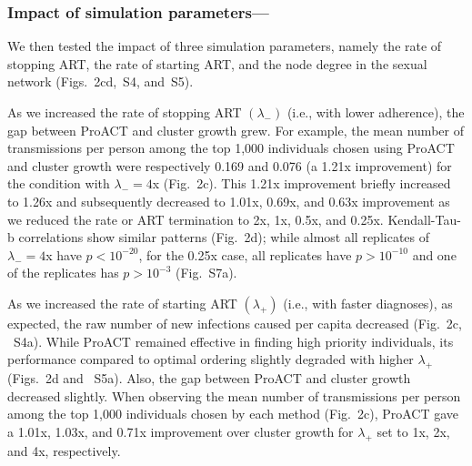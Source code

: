 \documentclass[a4paper,10pt]{article}
\begin{document}
\subsubsection{Impact of simulation parameters---}
We then tested the impact of three simulation parameters, namely the rate of stopping ART, the rate of starting ART, and the node degree in the sexual network (Figs.~2cd,~S4, and~S5).

As we increased the rate of stopping ART $\left(\lambda_{-}\right)$ (i.e., with lower adherence), the gap between ProACT and cluster growth grew.
For example, the mean number of transmissions per person among the top 1,000 individuals chosen using ProACT and cluster growth were respectively 0.169 and 0.076 (a 1.21x improvement) for the condition with $\lambda_-=4$x (Fig.~2c). 
This 1.21x improvement briefly increased to 1.26x and subsequently decreased to 1.01x, 0.69x, and 0.63x improvement as we reduced the rate or ART termination to 2x, 1x, 0.5x, and 0.25x.
Kendall-Tau-b correlations show similar patterns (Fig.~2d);
while almost all replicates of $\lambda_-=4$x have $p<10^{-20}$, for the 0.25x case, all replicates have $p>10^{-10}$ and one of the replicates has $p>10^{-3}$  (Fig.~S7a).
    






As we increased the rate of starting ART $\left(\lambda_{+}\right)$ (i.e., with faster diagnoses), as expected, the raw number of new infections caused per capita  decreased (Fig.~2c, ~S4a).
While ProACT remained effective in finding high priority individuals,
its performance compared to optimal ordering slightly degraded with higher $\lambda_{+}$ (Figs.~2d and ~S5a).
Also, the gap between ProACT and cluster growth decreased slightly.
When observing the mean number of transmissions per person among the top 1,000 individuals chosen by each method (Fig.~2c),
ProACT gave a 1.01x, 1.03x, and 0.71x improvement over cluster growth for $\lambda_{+}$ set to 1x, 2x, and 4x, respectively.
\end{document}
